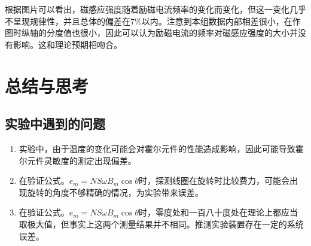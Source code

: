 \documentclass[zihao=5, UTF8]{article}
\theoremstyle{MyLineTheoremStyle} %
\theoremstyle{MyBlockTheoremStyle} %
\theoremstyle{MySubsubsectionStyle} %
\begin{document}
根据图片可以看出，磁感应强度随着励磁电流频率的变化而变化，但这一变化几乎不呈现规律性，并且总体的偏差在7\%以内。注意到本组数据内部相差很小，在作图时纵轴的分度值也很小，因此可以认为励磁电流的频率对磁感应强度的大小并没有影响。这和理论预期相吻合。

\section{总结与思考}

\subsection{实验中遇到的问题}
\begin{enumerate}
    \item 实验中，由于温度的变化可能会对霍尔元件的性能造成影响，因此可能导致霍尔元件灵敏度的测定出现偏差。
    \item 在验证公式。$e_m = NS \omega B_m \cos \theta$时，探测线圈在旋转时比较费力，可能会出现旋转的角度不够精确的情况，为实验带来误差。
    \item 在验证公式。$e_m = NS \omega B_m \cos \theta$时，零度处和一百八十度处在理论上都应当取极大值，但事实上这两个测量结果并不相同。推测实验装置存在一定的系统误差。
\end{enumerate}
\end{document}
